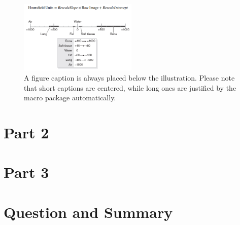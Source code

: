 \documentclass[a4paper,11pt]{article}
\begin{document}
\begin{figure}[h]
\centering
\includegraphics[width=0.5\textwidth]{HU.png}
\caption{A figure caption is always placed below the illustration.
Please note that short captions are centered, while long ones are
justified by the macro package automatically.}
\label{fig1}
\end{figure}

\section{Part 2}

\section{Part 3}

\section{Question and Summary}
\end{document}
